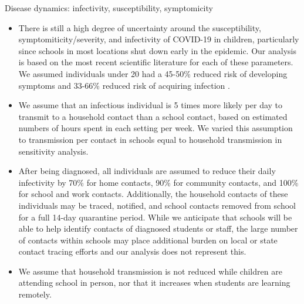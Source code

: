 \documentclass[preprint,12pt]{elsarticle}
\begin{document}
Disease dynamics: infectivity, susceptibility, symptomicity
\begin{itemize}
    \item There is still a high degree of uncertainty around the susceptibility, symptomiticity/severity, and infectivity of COVID-19 in children, particularly since schools in most locations shut down early in the epidemic. Our analysis is based on the most recent scientific literature for each of these parameters. We assumed individuals under 20 had a 45-50\% reduced risk of developing symptoms \cite{davies_age-dependent_nodate} and 33-66\% reduced risk of acquiring infection \cite{zhang_changes_2020}.
    \item We assume that an infectious individual is 5 times more likely per day to transmit to a household contact than a school contact, based on estimated numbers of hours spent in each setting per week. We varied this assumption to transmission per contact in schools equal to household transmission in sensitivity analysis. 
    \item After being diagnosed, all individuals are assumed to reduce their daily infectivity by 70\% for home contacts, 90\% for community contacts, and 100\% for school and work contacts. Additionally, the household contacts of these individuals may be traced, notified, and school contacts removed from school for a full 14-day quarantine period. While we anticipate that schools will be able to help identify contacts of diagnosed students or staff, the large number of contacts within schools may place additional burden on local or state contact tracing efforts and our analysis does not represent this.
    \item We assume that household transmission is not reduced while children are attending school in person, nor that it increases when students are learning remotely.
\end{itemize}
\end{document}
